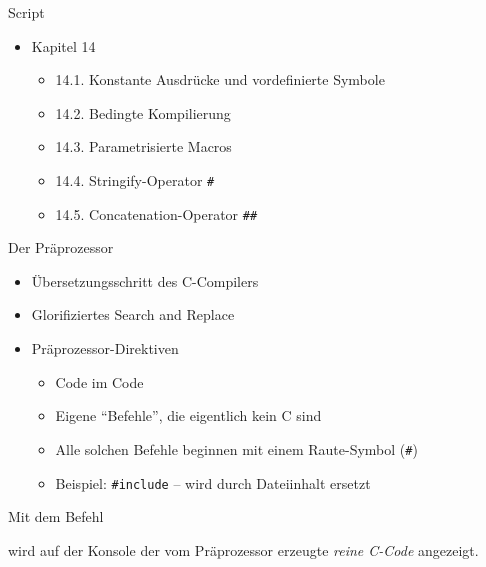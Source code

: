 
\begin{frame}[t,plain]
\titlepage
\end{frame}


\begin{frame}{Script}
%
\begin{itemize}
\item Kapitel 14
	\begin{itemize}
	\item 14.1. Konstante Ausdrücke und vordefinierte Symbole
	\item 14.2. Bedingte Kompilierung
	\item 14.3. Parametrisierte Macros
	\item 14.4. Stringify-Operator \texttt{\#}
	\item 14.5. Concatenation-Operator \texttt{\#\#}
	\end{itemize}
\end{itemize}
%
\end{frame}


\begin{frame}[fragile]{Der Präprozessor}
%
\begin{itemize}
\item Übersetzungsschritt des C-Compilers
\item Glorifiziertes Search and Replace
\item Präprozessor-Direktiven
	\begin{itemize}
	\item Code im Code
	\item Eigene \enquote{Befehle}, die eigentlich kein C sind
	\item Alle solchen Befehle beginnen mit einem Raute-Symbol (\texttt{\#})
	\item Beispiel: \texttt{#include} -- wird durch Dateiinhalt ersetzt
	\end{itemize}
\end{itemize}
%
\begin{hintbox}
Mit dem Befehl


wird auf der Konsole der vom Präprozessor erzeugte \emph{reine C-Code} angezeigt.
\end{hintbox}
%
\end{frame}

